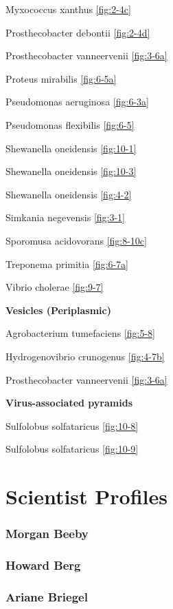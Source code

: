 \documentclass[]{tufte-book}
\begin{document}
Myxococcus xanthus \ref{fig:2-4c}

Prosthecobacter debontii \ref{fig:2-4d}

Prosthecobacter vanneervenii \ref{fig:3-6a}

Proteus mirabilis \ref{fig:6-5a}

Pseudomonas aeruginosa \ref{fig:6-3a}

Pseudomonas flexibilis \ref{fig:6-5}

Shewanella oneidensis \ref{fig:10-1}

Shewanella oneidensis \ref{fig:10-3}

Shewanella oneidensis \ref{fig:4-2}

Simkania negevensis \ref{fig:3-1}

Sporomusa acidovorans \ref{fig:8-10c}

Treponema primitia \ref{fig:6-7a}

Vibrio cholerae \ref{fig:9-7}

\textbf{Vesicles (Periplasmic)}

Agrobacterium tumefaciens \ref{fig:5-8}

Hydrogenovibrio crunogenus \ref{fig:4-7b}

Prosthecobacter vanneervenii \ref{fig:3-6a}

\textbf{Virus-associated pyramids}

Sulfolobus solfataricus \ref{fig:10-8}

Sulfolobus solfataricus \ref{fig:10-9}

\hypertarget{scientist-profiles}{%
\chapter{Scientist Profiles}\label{scientist-profiles}}

\hypertarget{morgan_beeby}{%
\subsection{Morgan Beeby}\label{morgan_beeby}}

\hypertarget{howard_berg}{%
\subsection{Howard Berg}\label{howard_berg}}

\hypertarget{ariane_briegel}{%
\subsection{Ariane Briegel}\label{ariane_briegel}}
\end{document}
